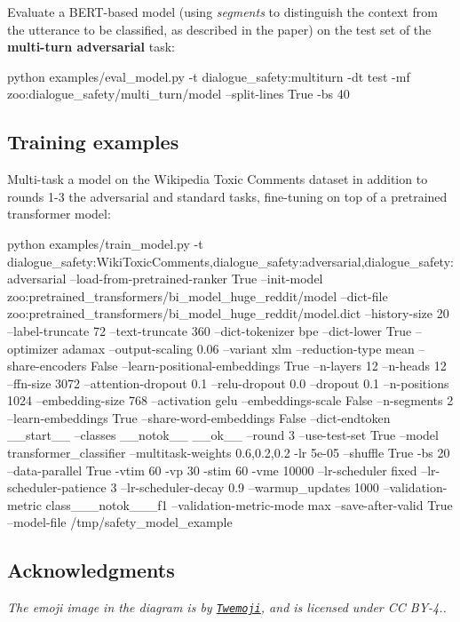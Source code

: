 Evaluate a B\+E\+R\+T-\/based model (using {\itshape segments} to distinguish the context from the utterance to be classified, as described in the paper) on the test set of the {\bfseries multi-\/turn adversarial} task\+: 
\begin{DoxyCode}
python examples/eval\_model.py -t dialogue\_safety:multiturn -dt test -mf
       zoo:dialogue\_safety/multi\_turn/model --split-lines True -bs 40
\end{DoxyCode}


\subsection*{Training examples}

Multi-\/task a model on the Wikipedia Toxic Comments dataset in addition to rounds 1-\/3 the adversarial and standard tasks, fine-\/tuning on top of a pretrained transformer model\+: 
\begin{DoxyCode}
python examples/train\_model.py -t
       dialogue\_safety:WikiToxicComments,dialogue\_safety:adversarial,dialogue\_safety:adversarial --load-from-pretrained-ranker True --init-model
       zoo:pretrained\_transformers/bi\_model\_huge\_reddit/model --dict-file zoo:pretrained\_transformers/bi\_model\_huge\_reddit/model.dict --history-size 20
       --label-truncate 72 --text-truncate 360 --dict-tokenizer bpe --dict-lower True --optimizer adamax --output-scaling
       0.06 --variant xlm --reduction-type mean --share-encoders False --learn-positional-embeddings True
       --n-layers 12 --n-heads 12 --ffn-size 3072 --attention-dropout 0.1 --relu-dropout 0.0 --dropout 0.1 --n-positions
       1024 --embedding-size 768 --activation gelu  --embeddings-scale False --n-segments 2 --learn-embeddings True
       --share-word-embeddings False --dict-endtoken \_\_start\_\_ --classes \_\_notok\_\_ \_\_ok\_\_ --round 3 --use-test-set
       True --model transformer\_classifier --multitask-weights 0.6,0.2,0.2 -lr 5e-05 --shuffle True -bs 20
       --data-parallel True -vtim 60 -vp 30 -stim 60 -vme 10000 --lr-scheduler fixed --lr-scheduler-patience 3
       --lr-scheduler-decay 0.9 --warmup\_updates 1000 --validation-metric class\_\_\_notok\_\_\_f1 --validation-metric-mode max
       --save-after-valid True --model-file /tmp/safety\_model\_example
\end{DoxyCode}


\subsection*{Acknowledgments}

{\itshape The emoji image in the diagram is by \href{https://github.com/twitter/twemoji}{\tt Twemoji}, and is licensed under CC B\+Y-\/4..} 